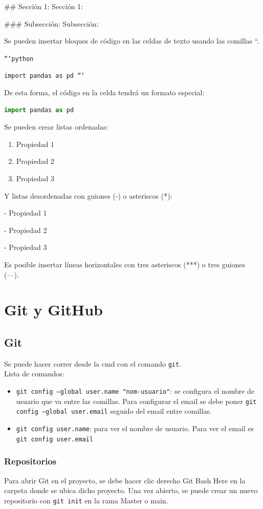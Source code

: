 \documentclass[a4paper, 12pt]{book}
\begin{document}
$\#\#$ Sección 1: {\Large Sección 1:}

$\#\#\#$ Subsección: {\large Subsección:}

Se pueden insertar bloques de código en las celdas de texto usando las comillas ``.

\texttt{```python}
	
\texttt{import pandas as pd
	```}

De esta forma, el código en la celda tendrá un formato especial:
\begin{lstlisting}[language=Python]
import pandas as pd
\end{lstlisting}


Se pueden crear listas ordenadas:
\begin{enumerate}
	\item Propiedad 1
	\item Propiedad 2
	\item Propiedad 3
\end{enumerate}
Y listas desordenadas con guiones (-) o asteriscos (*):

- Propiedad 1

- Propiedad 2

- Propiedad 3


Es posible insertar líneas horizontales con tres asteriscos (***) o tres guiones (---).


%
\chapter{Git y GitHub}
\section{Git}
Se puede hacer correr desde la cmd con el comando \texttt{git}. \\
Lista de comandos:
\begin{itemize}
\item \texttt{git config --global user.name "nom-usuario"}: se configura el nombre de usuario que va entre las comillas. Para configurar el email se debe poner \texttt{git config --global user.email} seguido del email entre comillas.
\item \texttt{git config user.name}: para ver el nombre de usuario. Para ver el email es \texttt{git config user.email}
\end{itemize}
\subsection{Repositorios}
Para abrir Git en el proyecto, se debe hacer clic derecho Git Bash Here en la carpeta donde se ubica dicho proyecto. Una vez abierto, se puede crear un nuevo repositorio con \texttt{git init} en la rama Master o main.
\end{document}
